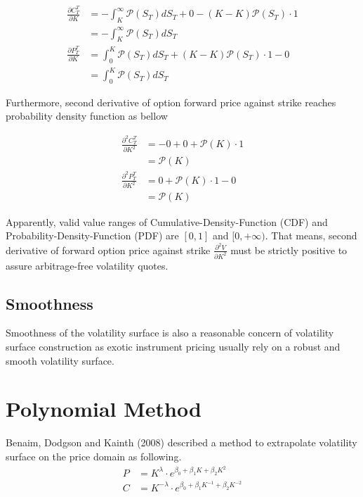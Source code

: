 \documentclass{article}
\begin{document}
\begin{subequations}
    \begin{align}
        \frac{\partial C_T^T}{\partial K} &= -\int_{K}^{\infty}{\mathcal{P}(S_T) d S_T} + 0 - (K - K) \mathcal{P}(S_T) \cdot 1\nonumber \\
        &= -\int_{K}^{\infty}{\mathcal{P}(S_T) d S_T} \\
        \frac{\partial P_T^T}{\partial K} &= \int_{0}^{K}{\mathcal{P}(S_T) d S_T} + \left(K - K\right) \mathcal{P}(S_T) \cdot 1 - 0\nonumber \\
        &= \int_{0}^{K}{\mathcal{P}(S_T) d S_T}
    \end{align}
\end{subequations}

Furthermore, second derivative of option forward price against strike reaches probability density function as bellow

\begin{subequations}
    \begin{align}
        \frac{\partial^2 C_T^T}{\partial K^2} &= -0 + 0 + \mathcal{P}(K) \cdot 1 \nonumber \\
        &= \mathcal{P}(K) \\
        \frac{\partial^2 P_T^T}{\partial K^2} &= 0 + \mathcal{P}(K) \cdot 1 - 0 \nonumber \\
        &= \mathcal{P}(K)
    \end{align}
\end{subequations}

Apparently, valid value ranges of Cumulative-Density-Function (CDF) and Probability-Density-Function (PDF) are $ [0, 1] $ and $ [0, +\infty) $.
That means, second derivative of forward option price against strike $ \frac{\partial^2 V}{\partial K^2} $ must be strictly positive to assure arbitrage-free volatility quotes. 

\subsection{Smoothness}
Smoothness of the volatility surface is also a reasonable concern of volatility surface construction as exotic instrument pricing usually rely on a robust and smooth volatility surface. 


\section{Polynomial Method}

Benaim, Dodgson and Kainth (2008) described a method to extrapolate volatility surface on the price domain as following.
\begin{subequations}
    \begin{align}
        P &= K^{\lambda} \cdot e^{\beta_0 + \beta_1 K + \beta_2 K^2} \\
        C &= K^{-\lambda} \cdot e^{\beta_0 + \beta_1 K^{-1} + \beta_2 K^{-2}}
    \end{align}
\end{subequations}
\end{document}
